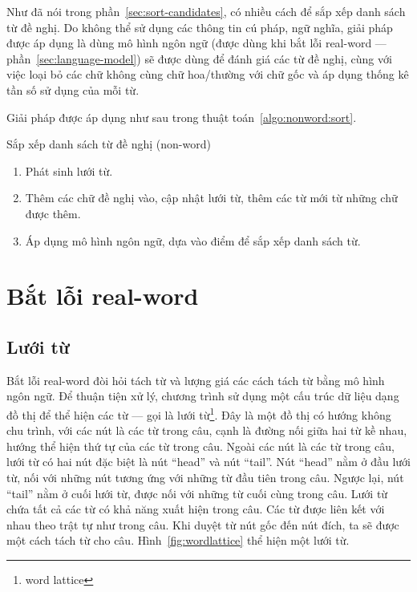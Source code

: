 \documentclass[a4paper,oneside,14pt]{extbook} %
\begin{document}
Như đã nói trong phần~\ref{sec:sort-candidates}, có nhiều cách để sắp
xếp danh sách từ đề nghị. Do không thể sử dụng các thông tin cú pháp,
ngữ nghĩa, giải pháp được áp dụng là dùng mô hình ngôn ngữ (được dùng
khi bắt lỗi real-word --- phần~\ref{sec:language-model}) sẽ được dùng
để đánh giá các từ đề nghị, cùng với việc loại bỏ các chữ không cùng
chữ hoa/thường với chữ gốc và áp dụng thống kê tần số sử dụng của mỗi
từ.

Giải pháp được áp dụng như sau trong thuật
toán~\ref{algo:nonword:sort}.
\begin{algo}
\caption{Sắp xếp danh sách từ đề nghị (non-word)}
\label{algo:nonword:sort}
  \begin{enumerate}
  \item Phát sinh lưới từ.
  \item Thêm các chữ đề nghị vào, cập nhật lưới từ, thêm các từ mới từ
    những chữ được thêm. 
  \item Áp dụng mô hình ngôn ngữ, dựa vào điểm để sắp xếp danh sách từ.
  \end{enumerate}
\end{algo}

\section{Bắt lỗi real-word}

\subsection{Lưới từ}
\label{sec:wordlattice}

Bắt lỗi real-word đòi hỏi tách từ và lượng giá các cách tách từ bằng
mô hình ngôn ngữ. Để thuận tiện xử lý, chương trình sử dụng một cấu
trúc dữ liệu dạng đồ thị để thể hiện các từ --- gọi là lưới
từ\footnote{word lattice}. Đây là một đồ thị có hướng không chu trình,
với các nút là các từ trong câu, cạnh là đường nối giữa hai từ kề
nhau, hướng thể hiện thứ tự của các từ trong câu. Ngoài các nút là các
từ trong câu, lưới từ có hai nút đặc biệt là nút ``head'' và nút
``tail''. Nút ``head'' nằm ở đầu lưới từ, nối với những nút tương ứng
với những từ đầu tiên trong câu. Ngược lại, nút ``tail'' nằm ở cuối
lưới từ, được nối với những từ cuối cùng trong câu.
Lưới từ chứa tất cả 
các từ có khả năng xuất hiện trong câu. Các từ được liên kết với nhau
theo trật tự như trong câu. Khi duyệt từ nút gốc đến nút đích, ta sẽ
được một cách tách từ cho câu. Hình~\ref{fig:wordlattice} thể hiện một
lưới từ.
\end{document}
